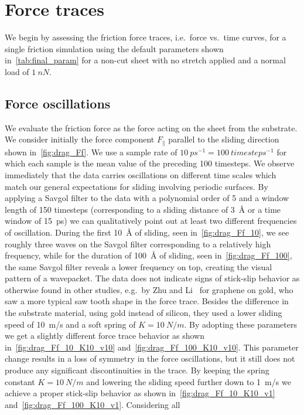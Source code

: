 \section{Force traces}\label{sec:single_analysis}
We begin by assessing the friction force traces, i.e.\ force vs.\ time curves, for a single friction simulation using the default parameters shown in~\cref{tab:final_param} for a non-cut sheet with
no stretch applied and a normal load of $\SI{1}{nN}$. 


\subsection{Force oscillations}\label{sec:force_oscillations}
We evaluate the friction force as the force acting on the sheet from the
substrate. We consider initially the force component $F_{\parallel}$ parallel to
the sliding direction shown in~\cref{fig:drag_Ff}. We use a sample rate of
\mbox{$\SI{10}{ps^{-1}} = \SI{100}{timesteps^{-1}}$} for which each sample is
the mean value of the preceding 100 timesteps. We observe immediately that the
data carries oscillations on different time scales which match our general
expectations for sliding involving periodic surfaces. By applying a Savgol
filter to the data with a polynomial order of 5 and a window length of 150
timesteps (corresponding to a sliding distance of \SI{3}{Å} or a time window of
\SI{15}{ps}) we can qualitatively point out at least two different frequencies
of oscillation. During the first \SI{10}{Å} of sliding, seen in~\cref{fig:drag_Ff_10},
we see roughly three waves on the Savgol filter corresponding to a relatively
high frequency, while for the duration of \SI{100}{Å} of sliding, seen in~\cref{fig:drag_Ff_100}, the same Savgol filter reveals a lower frequency on top,
creating the visual pattern of a wavepacket. The data does not indicate signs of stick-slip behavior as otherwise found in other studies, e.g.\ by Zhu
and Li~\cite{zhu_study_2018} for graphene on gold, who saw a more typical saw
tooth shape in the force trace. Besides the difference in the substrate
material, using gold instead of silicon, they used a lower sliding speed of
\SI{10}{m/s} and a soft spring of $K = \SI{10}{N/m}$. By adopting these
parameters we get a slightly different force trace behavior as shown in~\cref{fig:drag_Ff_10_K10_v10} and~\cref{fig:drag_Ff_100_K10_v10}. This parameter change results in a loss of symmetry in the force oscillations, but it still does not produce any significant discontinuities in the trace. By keeping the spring constant $K =
\SI{10}{N/m}$ and lowering the sliding speed further down to \SI{1}{m/s} we achieve a proper stick-slip behavior as shown in~\cref{fig:drag_Ff_10_K10_v1} and~\cref{fig:drag_Ff_100_K10_v1}. Considering all
